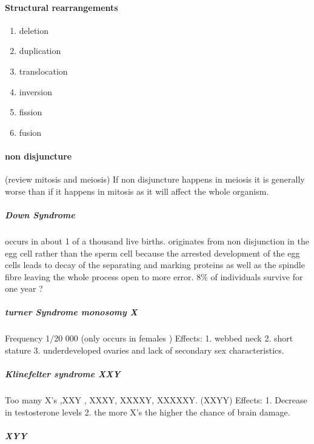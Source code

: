 \documentclass[]{article}
\providecommand{\tightlist}{%
  \setlength{\itemsep}{0pt}\setlength{\parskip}{0pt}}
\let\oldparagraph\paragraph
\renewcommand{\paragraph}[1]{\oldparagraph{#1}\mbox{}}
\let\oldsubparagraph\subparagraph
\renewcommand{\subparagraph}[1]{\oldsubparagraph{#1}\mbox{}}
\begin{document}
\hypertarget{structural-rearrangements}{%
\paragraph{Structural rearrangements}\label{structural-rearrangements}}

\begin{enumerate}
\def\labelenumi{\arabic{enumi}.}
\tightlist
\item
  deletion
\item
  duplication
\item
  translocation
\item
  inversion
\item
  fission
\item
  fusion
\end{enumerate}

\hypertarget{non-disjuncture}{%
\paragraph{non disjuncture}\label{non-disjuncture}}

(review mitosis and meiosis) If non disjuncture happens in meiosis it is
generally worse than if it happens in mitosis as it will affect the
whole organism.

\hypertarget{down-syndrome}{%
\subparagraph{Down Syndrome}\label{down-syndrome}}

occurs in about 1 of a thousand live births. originates from non
disjunction in the egg cell rather than the sperm cell because the
arrested development of the egg cells leads to decay of the separating
and marking proteins as well as the spindle fibre leaving the whole
process open to more error. 8\% of individuals survive for one year ?

\hypertarget{turner-syndrome-monosomy-x}{%
\subparagraph{turner Syndrome monosomy
X}\label{turner-syndrome-monosomy-x}}

Frequency 1/20 000 (only occurs in females ) Effects: 1. webbed neck 2.
short stature 3. underdeveloped ovaries and lack of secondary sex
characteristics.

\hypertarget{klinefelter-syndrome-xxy}{%
\subparagraph{Klinefelter syndrome XXY}\label{klinefelter-syndrome-xxy}}

Too many X's ,XXY , XXXY, XXXXY, XXXXXY. (XXYY) Effects: 1. Decrease in
testosterone levels 2. the more X's the higher the chance of brain
damage.

\hypertarget{xyy}{%
\subparagraph{XYY}\label{xyy}}
\end{document}
